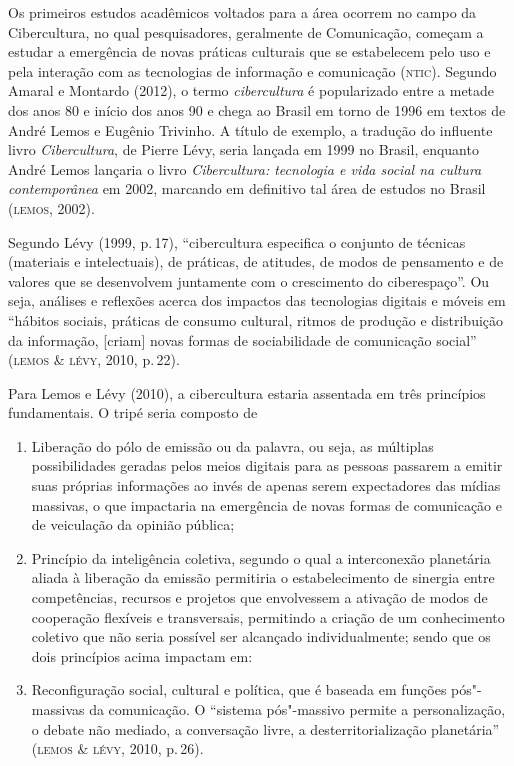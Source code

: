 Os primeiros estudos acadêmicos voltados para a área ocorrem no campo da
Cibercultura, no qual pesquisadores, geralmente de Comunicação,
começam a estudar a emergência de novas práticas culturais que se
estabelecem pelo uso e pela interação com as tecnologias de informação e
comunicação (\textsc{ntic}). Segundo Amaral e Montardo (2012), o termo
\textit{cibercultura} é popularizado entre a metade dos anos 80 e início dos anos
90 e chega ao Brasil em torno de 1996 em textos de André Lemos e Eugênio
Trivinho. A título de exemplo, a tradução do influente livro
\textit{Cibercultura}, de Pierre Lévy, seria lançada em 1999 no Brasil,
enquanto André Lemos lançaria o livro \textit{Cibercultura: tecnologia e
vida social na cultura contemporânea} em 2002, marcando em definitivo
tal área de estudos no Brasil (\textsc{lemos}, 2002).

Segundo Lévy (1999, p.\,17), ``cibercultura especifica o conjunto de
técnicas (materiais e intelectuais), de práticas, de atitudes, de modos
de pensamento e de valores que se desenvolvem juntamente com o
crescimento do ciberespaço''. Ou seja, análises e reflexões acerca dos
impactos das tecnologias digitais e móveis em ``hábitos sociais,
práticas de consumo cultural, ritmos de produção e distribuição da
informação, {[}criam{]} novas formas de sociabilidade de comunicação
social'' (\textsc{lemos \& lévy}, 2010, p.\,22).

Para Lemos e Lévy (2010), a cibercultura estaria assentada em três
princípios fundamentais. O tripé seria composto de 

\begin{enumerate}
\item Liberação do pólo de emissão ou da palavra, ou seja, as múltiplas possibilidades geradas pelos meios digitais para as pessoas passarem a emitir suas próprias informações ao invés de apenas serem expectadores das mídias massivas, o que impactaria na emergência de novas formas de comunicação e de veiculação da opinião pública;

\item Princípio da inteligência coletiva, segundo o qual a interconexão planetária aliada à liberação da emissão permitiria o estabelecimento de sinergia entre competências, recursos e projetos que envolvessem a ativação de modos de cooperação flexíveis e transversais, permitindo a criação de um conhecimento coletivo que não seria possível ser alcançado individualmente; sendo que os dois princípios acima impactam em:

\item Reconfiguração social, cultural e política, que é baseada em funções pós"-massivas da comunicação. O ``sistema pós"-massivo permite a personalização, o debate não mediado, a conversação livre, a desterritorialização planetária'' (\textsc{lemos \& lévy}, 2010, p.\,26). 
\end{enumerate}

